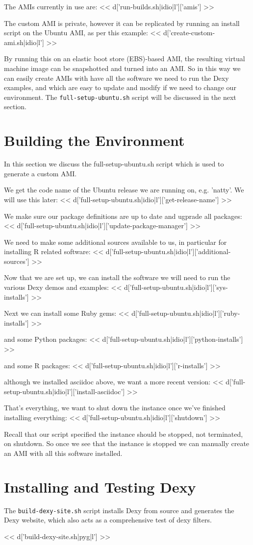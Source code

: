 \documentclass{tufte-handout}
\begin{document}
The AMIs currently in use are:
<< d['run-builds.sh|idio|l']['amis'] >>

The custom AMI is private, however it can be replicated by running an install
script on the Ubuntu AMI, as per this example:
<< d['create-custom-ami.sh|idio|l'] >>

By running this on an elastic boot store (EBS)-based AMI, the resulting virtual machine image can be snapshotted and turned into an AMI. So in this way we can easily create AMIs with have all the software we need to run the Dexy examples, and which are easy to update and modify if we need to change our environment. The \verb=full-setup-ubuntu.sh= script will be discussed in the next section.

\section{Building the Environment}

In this section we discuss the full-setup-ubuntu.sh script which is used to generate a custom AMI.

We get the code name of the Ubuntu release we are running on, e.g. 'natty'. We will use this later:
<< d['full-setup-ubuntu.sh|idio|l']['get-release-name'] >>

We make sure our package definitions are up to date and ugprade all packages:
<< d['full-setup-ubuntu.sh|idio|l']['update-package-manager'] >>

We need to make some additional sources available to us, in particular for installing R related software:
<< d['full-setup-ubuntu.sh|idio|l']['additional-sources'] >>

Now that we are set up, we can install the software we will need to run the various Dexy demos and examples:
<< d['full-setup-ubuntu.sh|idio|l']['sys-installs'] >>

Next we can install some Ruby gems:
<< d['full-setup-ubuntu.sh|idio|l']['ruby-installs'] >>

and some Python packages:
<< d['full-setup-ubuntu.sh|idio|l']['python-installs'] >>

and some R packages:
<< d['full-setup-ubuntu.sh|idio|l']['r-installs'] >>

although we installed asciidoc above, we want a more recent version:
<< d['full-setup-ubuntu.sh|idio|l']['install-asciidoc'] >>

That's everything, we want to shut down the instance once we've finished installing everything:
<< d['full-setup-ubuntu.sh|idio|l']['shutdown'] >>

Recall that our script specified the instance should be stopped, not terminated, on shutdown. So once we see that the instance is stopped we can manually create an AMI with all this software installed.

\section{Installing and Testing Dexy}

The \verb|build-dexy-site.sh| script installs Dexy from source and generates the Dexy website, which also acts as a comprehensive test of dexy filters.

<< d['build-dexy-site.sh|pyg|l'] >>
\end{document}
